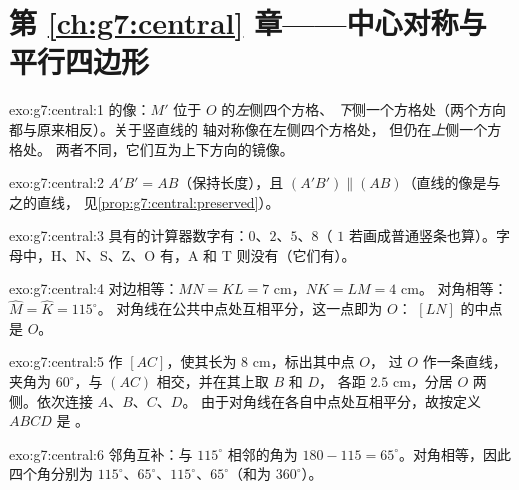\section*{第 \ref{ch:g7:central} 章——中心对称与平行四边形}

\begin{solution}{exo:g7:central:1}
的像：$M'$ 位于 $O$ 的\emph{左}侧四个方格、
\emph{下}侧一个方格处（两个方向都与原来相反）。关于竖直线的
轴对称像在左侧四个方格处，
但仍在\emph{上}侧一个方格处。
两者不同，它们互为上下方向的镜像。
\end{solution}

\begin{solution}{exo:g7:central:2}
$A'B' = AB$（保持长度），且
$(A'B') \parallel (AB)$（直线的像是与之的直线，
见\cref{prop:g7:central:preserved}）。
\end{solution}

\begin{solution}{exo:g7:central:3}
具有的计算器数字有：$0$、$2$、$5$、$8$（
$1$ 若画成普通竖条也算）。字母中，H、N、S、Z、O 有，A 和
T 则没有（它们有）。
\end{solution}

\begin{solution}{exo:g7:central:4}
对边相等：$MN = KL = 7$ cm，$NK = LM = 4$ cm。
对角相等：$\widehat M = \widehat K = 115^\circ$。
对角线在公共中点处互相平分，这一点即为 $O$：
 $[LN]$ 的中点是 $O$。
\end{solution}

\begin{solution}{exo:g7:central:5}
作 $[AC]$，使其长为 $8$ cm，标出其中点 $O$，
过 $O$ 作一条直线，夹角为 $60^\circ$，与 $(AC)$ 相交，并在其上取 $B$ 和 $D$，
各距 $2.5$ cm，分居 $O$ 两侧。依次连接 $A$、$B$、$C$、$D$。
由于对角线在各自中点处互相平分，故按定义 $ABCD$ 是
。
\end{solution}

\begin{solution}{exo:g7:central:6}
邻角互补：与 $115^\circ$ 相邻的角为
$180 - 115 = 65^\circ$。对角相等，因此四个角分别为
$115^\circ$、$65^\circ$、$115^\circ$、$65^\circ$（和为
$360^\circ$）。
\end{solution}

